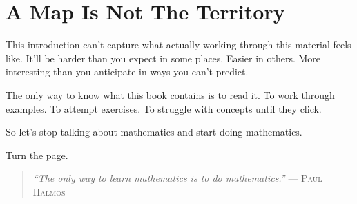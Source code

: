 \section*{A Map Is Not The Territory}

This introduction can't capture what actually working through this material feels like. It'll be harder than you expect in some places. Easier in others. More interesting than you anticipate in ways you can't predict.

The only way to know what this book contains is to read it. To work through examples. To attempt exercises. To struggle with concepts until they click.

So let's stop talking about mathematics and start doing mathematics.

Turn the page.

\vfill

\begin{quote}
\textit{``The only way to learn mathematics is to do mathematics.''}
\hfill--- \textsc{Paul Halmos}
\end{quote}

\clearpage